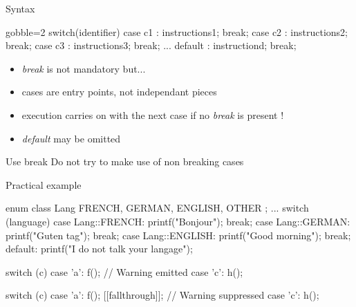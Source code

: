 \begin{frame}[fragile]
  \begin{block}{Syntax}
    \begin{cppcode*}{gobble=2}
      switch(identifier) {
        case c1 : instructions1; break;
        case c2 : instructions2; break;
        case c3 : instructions3; break;
        ...
        default : instructiond; break;
      }
    \end{cppcode*}
    \begin{itemize}
      \item {\it break} is not mandatory but...
      \item cases are entry points, not independant pieces
      \item execution carries on with the next case if no {\it break} is present !
      \item {\it default} may be omitted
    \end{itemize}
  \end{block}
  \pause
  \begin{alertblock}{Use break}
    Do not try to make use of non breaking cases
  \end{alertblock}
\end{frame}

\begin{frame}[fragile]
  \begin{exampleblock}{Practical example}
    \begin{cppcode*}{}
      enum class Lang { FRENCH, GERMAN, ENGLISH, OTHER };
      ...
      switch (language) {
      case Lang::FRENCH:
        printf("Bonjour");
        break;
      case Lang::GERMAN:
        printf("Guten tag");
        break;
      case Lang::ENGLISH:
        printf("Good morning");
        break;
      default:
        printf("I do not talk your langage");
      }
    \end{cppcode*}
  \end{exampleblock}
\end{frame}


\begin{frame}[fragile]
  \begin{alertblock}{}
    \begin{cppcode}
      switch (c) {
        case 'a':
          f(); // Warning emitted
        case 'c':
          h();
      }
    \end{cppcode}
  \end{alertblock}
  \begin{exampleblock}{}
    \begin{cppcode*}{}
      switch (c) {
        case 'a':
          f();
          [[fallthrough]]; // Warning suppressed
        case 'c':
          h();
      }
    \end{cppcode*}
  \end{exampleblock}
\end{frame}

